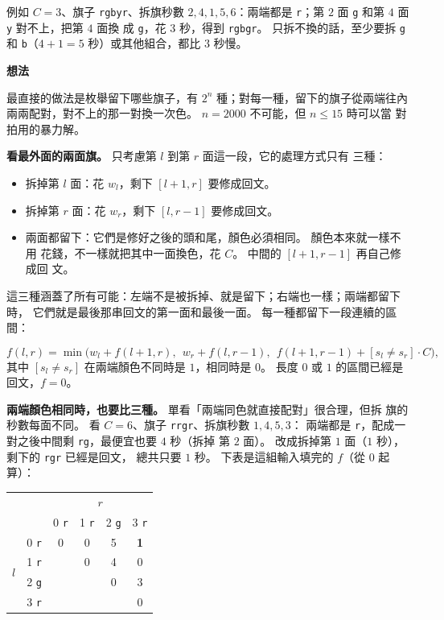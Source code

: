 例如 $C = 3$、旗子 \texttt{rgbyr}、拆旗秒數 $2, 4, 1, 5, 6$：兩端都是
\texttt{r}；第 $2$ 面 \texttt{g} 和第 $4$ 面 \texttt{y} 對不上，把第 $4$ 面換
成 \texttt{g}，花 $3$ 秒，得到 \texttt{rgbgr}。 只拆不換的話，至少要拆
\texttt{g} 和 \texttt{b}（$4 + 1 = 5$ 秒）或其他組合，都比 $3$ 秒慢。

\textbf{想法}

最直接的做法是枚舉留下哪些旗子，有 $2^n$ 種；對每一種，留下的旗子從兩端往內
兩兩配對，對不上的那一對換一次色。 $n = 2000$ 不可能，但 $n \le 15$ 時可以當
對拍用的暴力解。

\textbf{看最外面的兩面旗。} 只考慮第 $l$ 到第 $r$ 面這一段，它的處理方式只有
三種：

\begin{itemize}
\item 拆掉第 $l$ 面：花 $w_l$，剩下 $[l + 1, r]$ 要修成回文。
\item 拆掉第 $r$ 面：花 $w_r$，剩下 $[l, r - 1]$ 要修成回文。
\item 兩面都留下：它們是修好之後的頭和尾，顏色必須相同。 顏色本來就一樣不用
花錢，不一樣就把其中一面換色，花 $C$。 中間的 $[l + 1, r - 1]$ 再自己修成回
文。
\end{itemize}

這三種涵蓋了所有可能：左端不是被拆掉、就是留下；右端也一樣；兩端都留下時，
它們就是最後那串回文的第一面和最後一面。 每一種都留下一段連續的區間：

\begin{center}
\end{center}

\[
f(l, r) = \min\bigl(w_l + f(l + 1, r),\ \ w_r + f(l, r - 1),\ \ f(l + 1, r - 1) + [s_l \ne s_r] \cdot C\bigr),
\]
其中 $[s_l \ne s_r]$ 在兩端顏色不同時是 $1$，相同時是 $0$。 長度 $0$ 或
$1$ 的區間已經是回文，$f = 0$。

\textbf{兩端顏色相同時，也要比三種。} 單看「兩端同色就直接配對」很合理，但拆
旗的秒數每面不同。 看 $C = 6$、旗子 \texttt{rrgr}、拆旗秒數 $1, 4, 5, 3$：
兩端都是 \texttt{r}，配成一對之後中間剩 \texttt{rg}，最便宜也要 $4$ 秒（拆掉
第 $2$ 面）。 改成拆掉第 $1$ 面（$1$ 秒），剩下的 \texttt{rgr} 已經是回文，
總共只要 $1$ 秒。 下表是這組輸入填完的 $f$（從 $0$ 起算）：

\begin{center}
\begin{tabular}{cc|cccc}
\toprule
 & & \multicolumn{4}{c}{$r$} \\
 & & 0 \texttt{r} & 1 \texttt{r} & 2 \texttt{g} & 3 \texttt{r} \\
\midrule
\multirow{4}{*}{$l$} & 0 \texttt{r} & 0 & 0 & 5 & \textbf{1} \\
 & 1 \texttt{r} & & 0 & 4 & 0 \\
 & 2 \texttt{g} & & & 0 & 3 \\
 & 3 \texttt{r} & & & & 0 \\
\bottomrule
\end{tabular}
\end{center}

